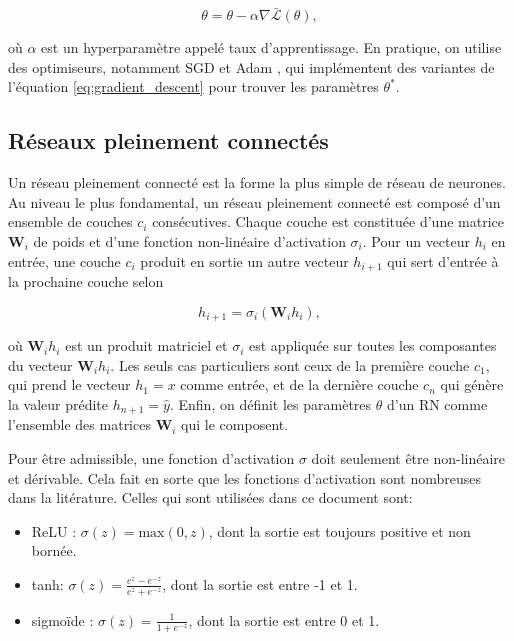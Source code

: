 \begin{equation}
    \theta = \theta - \alpha \nabla \bar{\mathcal{L}}(\theta),
    \label{eq:gradient_descent}
\end{equation}

où $\alpha$ est un hyperparamètre appelé taux d'apprentissage.
En pratique, on utilise des optimiseurs, notamment SGD \citep{robbins1951stochastic}
et Adam \citep{kingma2014method}, qui implémentent des variantes 
de l'équation \eqref{eq:gradient_descent} pour trouver les paramètres $\theta^*$.


\subsection{Réseaux pleinement connectés}
\label{subsec:FC}

Un réseau pleinement connecté est la forme la plus simple 
de réseau de neurones.
Au niveau le plus fondamental, un réseau pleinement connecté
est composé d'un ensemble de couches $c_i$ consécutives.
Chaque couche est constituée d'une matrice $\mathbf{W}_i$ de poids 
et d'une fonction non-linéaire d'activation $\sigma_i$.
Pour un vecteur $h_i$ en entrée, une couche $c_i$ produit en sortie 
un autre vecteur $h_{i+1}$ qui sert d'entrée à la prochaine couche selon 

\begin{equation*}
    h_{i+1} = \sigma_i \left( \mathbf{W}_i h_i\right),
\end{equation*}

où $\mathbf{W}_i h_i$ est un produit matriciel et $\sigma_i$ 
est appliquée sur toutes les composantes du vecteur $\mathbf{W}_i h_i$.
Les seuls cas particuliers sont ceux de la première couche $c_1$, qui
prend le vecteur $h_1=x$ comme entrée, et de la dernière couche $c_n$ qui 
génère la valeur prédite $h_{n+1}=\hat{y}$.
Enfin, on définit les paramètres $\theta$ d'un RN comme 
l'ensemble des matrices $\mathbf{W}_i$ qui le composent.

Pour être admissible, une fonction d'activation $\sigma$ doit seulement 
être non-linéaire et dérivable.
Cela fait en sorte que les fonctions d'activation sont nombreuses 
dans la litérature.
Celles qui sont utilisées dans ce document sont:
\begin{itemize}
    \item ReLU \citep{xu2015empirical}: $\sigma(z) = \text{max}(0, z)$, dont la sortie 
    est toujours positive et non bornée.
    \item tanh: $\sigma(z) = \frac{e^z - e^{-z}}{e^z + e^{-z}}$, dont la 
    sortie est entre -1 et 1.
    \item sigmoïde : $\sigma(z) = \frac{1}{1 + e^{-z}}$, dont la sortie est entre 
    0 et 1.
\end{itemize}

